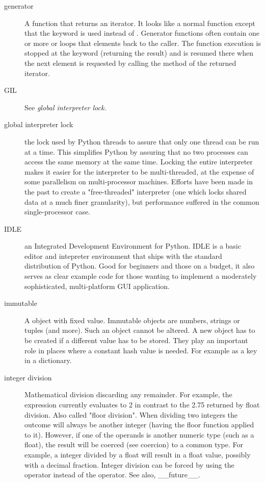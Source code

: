 \begin{description}
\item[generator]{A function that returns an iterator.  It looks like a
normal function except that the  keyword is used instead of
{}.  Generator functions often contain one or more
{} or  loops that  elements back to
the caller.  The function execution is stopped at the  keyword
(returning the result) and is resumed there when the next element is
requested by calling the  method of the returned iterator.}

\item[GIL]{See \em{global interpreter lock}.}

\item[global interpreter lock]{the lock used by Python threads to assure
that only one thread can be run at a time.  This simplifies Python by
assuring that no two processes can access the same memory at the same time.
Locking the entire interpreter makes it easier for the interpreter to be
multi-threaded, at the expense of some parallelism on multi-processor
machines.  Efforts have been made in the past to create a "free-threaded"
interpreter (one which locks shared data at a much finer granularity), but
performance suffered in the common single-processor case.}

\item[IDLE]{an Integrated Development Environment for Python.  IDLE is a
basic editor and intepreter environment that ships with the standard
distribution of Python.  Good for beginners and those on a budget, it also
serves as clear example code for those wanting to implement a moderately
sophisticated, multi-platform GUI application.}

\item[immutable]{A object with fixed value.  Immutable objects are numbers,
strings or tuples (and more).  Such an object cannot be altered.  A new object
has to be created if a different value has to be stored.  They play an
important role in places where a constant hash value is needed.  For example
as a key in a dictionary.}

\item[integer division]{Mathematical division discarding any remainder.  For
example, the expression  currently evaluates to 2 in contrast
to the 2.75 returned by float division.  Also called "floor division".  When
dividing two integers the outcome will always be another integer (having the
floor function applied to it).  However, if one of the operands is another
numeric type (such as a float), the result will be coerced (see coercion) to
a common type.  For example, a integer divided by a float will result in a
float value, possibly with a decimal fraction.  Integer division can be
forced by using the \code{//} operator instead of the \code{/} operator.
See also, __future__.}


\end{description}
